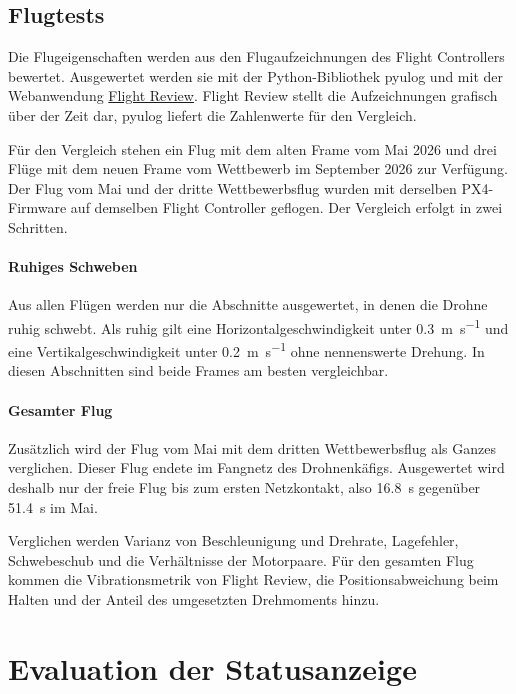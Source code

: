         \subsection{Flugtests}
        \label{sec:Eval_Frame_Flug}

        Die Flugeigenschaften werden aus den Flugaufzeichnungen des Flight Controllers bewertet. Ausgewertet werden sie mit der Python-Bibliothek pyulog und mit der Webanwendung \href{https://logs.px4.io/}{Flight Review}. Flight Review stellt die Aufzeichnungen grafisch über der Zeit dar, pyulog liefert die Zahlenwerte für den Vergleich. %

        Für den Vergleich stehen ein Flug mit dem alten Frame vom Mai 2026 und drei Flüge mit dem neuen Frame vom Wettbewerb im September 2026 zur Verfügung. Der Flug vom Mai und der dritte Wettbewerbsflug wurden mit derselben PX4-Firmware auf demselben Flight Controller geflogen. Der Vergleich erfolgt in zwei Schritten.

        \paragraph{Ruhiges Schweben}
        Aus allen Flügen werden nur die Abschnitte ausgewertet, in denen die Drohne ruhig schwebt. Als ruhig gilt eine Horizontalgeschwindigkeit unter \SI{0,3}{\metre\per\second} und eine Vertikalgeschwindigkeit unter \SI{0,2}{\metre\per\second} ohne nennenswerte Drehung. In diesen Abschnitten sind beide Frames am besten vergleichbar.

        \paragraph{Gesamter Flug}
        Zusätzlich wird der Flug vom Mai mit dem dritten Wettbewerbsflug als Ganzes verglichen. Dieser Flug endete im Fangnetz des Drohnenkäfigs. Ausgewertet wird deshalb nur der freie Flug bis zum ersten Netzkontakt, also \SI{16,8}{\second} gegenüber \SI{51,4}{\second} im Mai.

        Verglichen werden Varianz von Beschleunigung und Drehrate, Lagefehler, Schwebeschub und die Verhältnisse der Motorpaare. Für den gesamten Flug kommen die Vibrationsmetrik von Flight Review, die Positionsabweichung beim Halten und der Anteil des umgesetzten Drehmoments hinzu.

    \section{Evaluation der Statusanzeige}
    \label{sec:Eval_LED}

